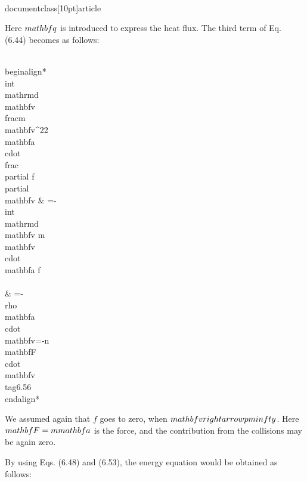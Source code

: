 \\documentclass[10pt]{article}
\begin{document}
{{{{Here $\\mathbf{q}$ is introduced to express the heat flux. The third term of Eq. (6.44) becomes as follows:


\\begin{align*}
\\int \\mathrm{d} \\mathbf{v} \\frac{m \\mathbf{v}^{2}}{2} \\mathbf{a} \\cdot \\frac{\\partial f}{\\partial \\mathbf{v}} & =-\\int \\mathrm{d} \\mathbf{v} m \\mathbf{v} \\cdot \\mathbf{a} f \\\\
& =-\\rho \\mathbf{a} \\cdot \\mathbf{v}=-n \\mathbf{F} \\cdot \\mathbf{v} \\tag{6.56}
\\end{align*}


We assumed again that $f$ goes to zero, when $\\mathbf{v} \\rightarrow \\pm \\infty$. Here $\\mathbf{F}=m \\mathbf{a}$ is the force, and the contribution from the collisions may be again zero.

By using Eqs. (6.48) and (6.53), the energy equation would be obtained as follows:


}}}}
\end{document}
